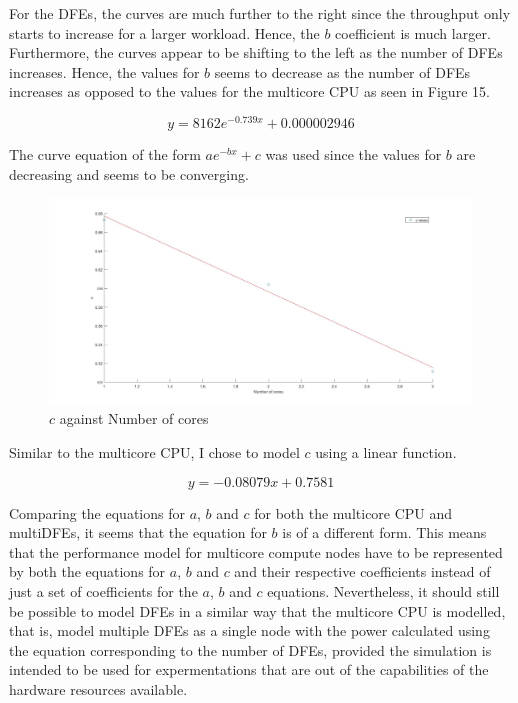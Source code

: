 \documentclass[a4paper,11pt]{article}
\begin{document}
\noindent For the DFEs, the curves are much further to the right since the throughput only starts to increase for a larger workload. Hence, the $b$ coefficient is much larger. Furthermore, the curves appear to be shifting to the left as the number of DFEs increases. Hence, the values for $b$ seems to decrease as the number of DFEs increases as opposed to the values for the multicore CPU as seen in Figure 15.

\begin{equation}
y=8162e^{-0.739x} + 0.000002946
\end{equation}

\noindent The curve equation of the form $ae^{-bx}+c$ was used since the values for $b$ are decreasing and seems to be converging.

\begin{figure}[H]
	\hspace{-2.8cm}
	\includegraphics[scale=0.3]{images/dfe_c}
	\caption{$c$ against Number of cores}
\end{figure}

\noindent Similar to the multicore CPU, I chose to model $c$ using a linear function. 

\begin{equation}
y=-0.08079x+0.7581
\end{equation}

\noindent Comparing the equations for $a$, $b$ and $c$ for both the multicore CPU and multiDFEs, it seems that the equation for $b$ is of a different form. This means that the performance model for multicore compute nodes have to be represented by both the equations for $a$, $b$ and $c$ and their respective coefficients instead of just a set of coefficients for the $a$, $b$ and $c$ equations. Nevertheless, it should still be possible to model DFEs in a similar way that the multicore CPU is modelled, that is, model multiple DFEs as a single node with the power calculated using the equation corresponding to the number of DFEs, provided the simulation is intended to be used for expermentations that are out of the capabilities of the hardware resources available.
\end{document}
